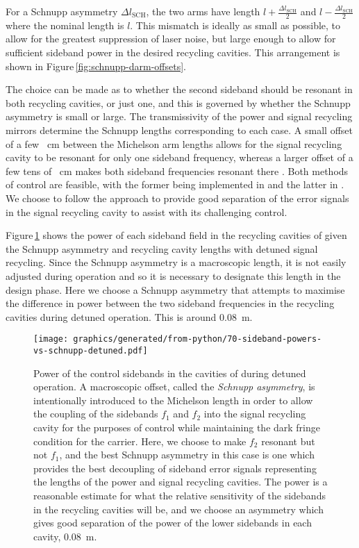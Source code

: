 For a Schnupp asymmetry $\Delta l_{\text{SCH}}$, the two arms have length $l + \frac{\Delta l_{\text{SCH}}}{2}$ and $l - \frac{\Delta l_{\text{SCH}}}{2}$ where the nominal length is $l$. This mismatch is ideally as small as possible, to allow for the greatest suppression of laser noise, but large enough to allow for sufficient sideband power in the desired recycling cavities. This arrangement is shown in Figure\,\ref{fig:schnupp-darm-offsets}.

The choice can be made as to whether the second sideband should be resonant in both recycling cavities, or just one, and this is governed by whether the Schnupp asymmetry is small or large. The transmissivity of the power and signal recycling mirrors determine the Schnupp lengths corresponding to each case. A small offset of a few \SI{}{\centi\meter} between the Michelson arm lengths allows for the signal recycling cavity to be resonant for only one sideband frequency, whereas a larger offset of a few tens of \SI{}{\centi\meter} makes both sideband frequencies resonant there \cite{Vajente2008}. Both methods of control are feasible, with the former being implemented in \ALIGO{} \cite{Abbott2010} and the latter in \KAGRA{} \cite{kagra2013}. We choose to follow the \ALIGO{} approach to provide good separation of the error signals in the signal recycling cavity to assist with its challenging control.

Figure\,\ref{fig:sideband-powers-vs-schnupp-detuned} shows the power of each sideband field in the recycling cavities of \ETLF{} given the Schnupp asymmetry and recycling cavity lengths with detuned signal recycling. Since the Schnupp asymmetry is a macroscopic length, it is not easily adjusted during operation and so it is necessary to designate this length in the design phase. Here we choose a Schnupp asymmetry that attempts to maximise the difference in power between the two sideband frequencies in the recycling cavities during detuned operation. This is around \SI{0.08}{\meter}.

\begin{figure}
  \centering
  \texttt{[image: graphics/generated/from-python/70-sideband-powers-vs-schnupp-detuned.pdf]}
  \caption[Power of the control sidebands in the cavities of \ETLF{} in the detuned configuration]{\label{fig:sideband-powers-vs-schnupp-detuned}Power of the control sidebands in the cavities of \ETLF{} during detuned operation. A macroscopic offset, called the \emph{Schnupp asymmetry}, is intentionally introduced to the Michelson length in order to allow the coupling of the sidebands $f_1$ and $f_2$ into the signal recycling cavity for the purposes of control while maintaining the dark fringe condition for the carrier. Here, we choose to make $f_2$ resonant but not $f_1$, and the best Schnupp asymmetry in this case is one which provides the best decoupling of sideband error signals representing the lengths of the power and signal recycling cavities. The power is a reasonable estimate for what the relative sensitivity of the sidebands in the recycling cavities will be, and we choose an asymmetry which gives good separation of the power of the lower sidebands in each cavity, \SI{0.08}{\meter}.}
\end{figure}

